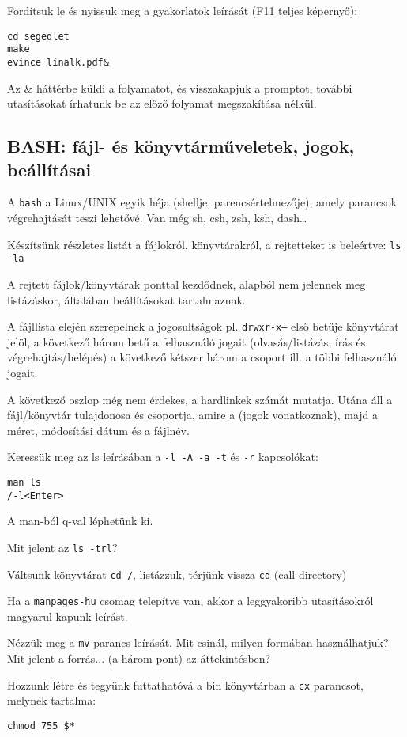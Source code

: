 \documentclass[a4paper]{article}
\newcommand{\code}{\texttt}
\begin{document}
Fordítsuk le és nyissuk meg a gyakorlatok leírását
(F11 teljes képernyő):
\begin{Verbatim}
cd segedlet
make
evince linalk.pdf&
\end{Verbatim}
Az \& háttérbe küldi a folyamatot, és visszakapjuk a promptot, további
utasításokat írhatunk be az előző folyamat megszakítása nélkül.

\subsection{BASH: fájl- és könyvtárműveletek, jogok, beállításai}

A \code{bash} a Linux/UNIX egyik héja (shellje, parencsértelmezője),
amely parancsok végrehajtását teszi lehetővé. Van még sh, csh, zsh,
ksh, dash\dots

Készítsünk részletes listát a fájlokról, könyvtárakról, a rejtetteket is
beleértve:
\code{ls -la}

A rejtett fájlok/könyvtárak ponttal kezdődnek, alapból nem jelennek meg
listázáskor, általában beállításokat tartalmaznak.

A fájllista elején szerepelnek a jogosultságok pl. \code{drwxr-x---}
első betűje könyvtárat jelöl, a következő három betű a felhasználó
jogait (olvasás/listázás, írás és végrehajtás/belépés) a következő
kétszer három a csoport ill. a többi felhasználó jogait.

A következő oszlop még nem érdekes, a hardlinkek számát mutatja.
Utána áll a fájl/könyvtár tulajdonosa és csoportja, amire a (jogok
vonatkoznak), majd a méret, módosítási dátum és a fájlnév.

Keressük meg az ls leírásában a \code{-l -A -a -t} és \code{-r} kapcsolókat:
\begin{Verbatim}
man ls
/-l<Enter>
\end{Verbatim}
A man-ból q-val léphetünk ki.

Mit jelent az \code{ls -trl}?

Váltsunk könyvtárat \code{cd /}, listázzuk, térjünk vissza \code{cd}
(call directory)

Ha a \code{manpages-hu} csomag telepítve van, akkor a leggyakoribb
utasításokról magyarul kapunk leírást.

Nézzük meg a \code{mv} parancs leírását. Mit csinál, milyen formában
használhatjuk? Mit jelent a forrás... (a három pont) az áttekintésben?

Hozzunk létre és tegyünk futtathatóvá a bin könyvtárban a
\code{cx} parancsot, melynek tartalma:
\begin{verbatim}
chmod 755 $*
\end{verbatim}
\end{document}
